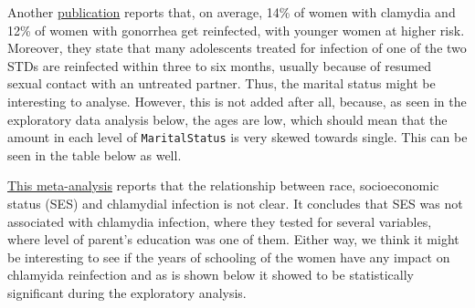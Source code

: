 \documentclass[
]{article}
\begin{document}
Another \href{https://policylab.chop.edu/sites/default/files/pdf/publications/Preventing_Chlamydia_Gonorrhea_Reinfection_through_Increased_Use_of_EPT.pdf}{publication} reports that, on average, 14\% of women with clamydia and 12\% of women with gonorrhea get reinfected, with younger women at higher risk. Moreover, they state that many adolescents treated for infection of one of the two STDs are reinfected within three to six months, usually because of resumed sexual contact with an untreated partner. Thus, the marital status might be interesting to analyse. However, this is not added after all, because, as seen in the exploratory data analysis below, the ages are low, which should mean that the amount in each level of \texttt{MaritalStatus} is very skewed towards single. This can be seen in the table below as well.

\href{https://www.ncbi.nlm.nih.gov/pmc/articles/PMC2094865/}{This meta-analysis} reports that the relationship between race, socioeconomic status (SES) and chlamydial infection is not clear. It concludes that SES was not associated with chlamydia infection, where they tested for several variables, where level of parent's education was one of them. Either way, we think it might be interesting to see if the years of schooling of the women have any impact on chlamyida reinfection and as is shown below it showed to be statistically significant during the exploratory analysis.
\end{document}
